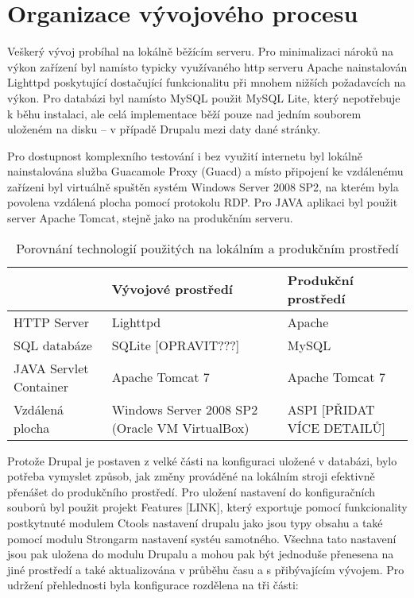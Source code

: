 
\chapter{Organizace vývojového procesu}

Veškerý vývoj probíhal na lokálně běžícím serveru. Pro minimalizaci nároků na výkon zařízení byl namísto typicky využívaného http serveru Apache nainstalován Lighttpd poskytující dostačující funkcionalitu při mnohem nižších požadavcích na výkon. Pro databázi byl namísto MySQL použit MySQL Lite, který nepotřebuje k běhu instalaci, ale celá implementace běží pouze nad jedním souborem uloženém na disku – v případě Drupalu mezi daty dané stránky. 

Pro dostupnost komplexního testování i bez využití internetu byl lokálně nainstalována služba Guacamole Proxy (Guacd) a místo připojení ke vzdálenému zařízeni byl virtuálně spuštěn systém Windows Server 2008 SP2, na kterém byla povolena vzdálená plocha pomocí protokolu RDP. Pro JAVA aplikaci byl použit server Apache Tomcat, stejně jako na produkčním serveru.

\begin{table}
  \caption{Porovnání technologií použitých na lokálním a produkčním prostředí}
  \begin{tabular}{ | p{3cm} | p{4cm} | p{4cm} | }
    \hline  
    & Vývojové prostředí & Produkční prostředí \\ \hline
    HTTP Server & Lighttpd & Apache \\ \hline
    SQL databáze & SQLite [OPRAVIT???] & MySQL \\ \hline
    JAVA Servlet Container & Apache Tomcat 7 & Apache Tomcat 7 \\ \hline
    Vzdálená plocha & Windows Server 2008 SP2 (Oracle VM VirtualBox) & ASPI [PŘIDAT VÍCE DETAILŮ] \\ \hline
  \end{tabular}
\end{table}

Protože Drupal je postaven z velké části na konfiguraci uložené v databázi, bylo potřeba vymyslet způsob, jak změny prováděné na lokálním stroji efektivně přenášet do produkčního prostředí. Pro uložení nastavení do konfiguračních souborů byl použit projekt Features [LINK], který exportuje pomocí funkcionality postkytnuté modulem Ctools nastavení drupalu jako jsou typy obsahu a také pomocí modulu Strongarm nastavení systéu samotného. Všechna tato nastavení jsou pak uložena do modulu Drupalu a mohou pak být jednoduše přenesena na jiné prostředí a také aktualizována v průběhu času a s přibývajícím vývojem. Pro udržení přehlednosti byla konfigurace rozdělena na tři části:

